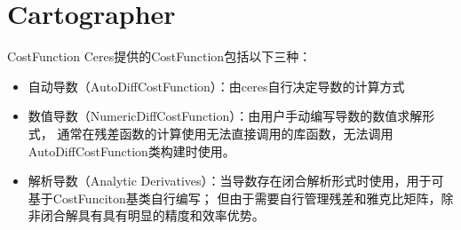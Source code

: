 \section{Cartographer}


\begin{frame}{CostFunction}
Ceres提供的CostFunction包括以下三种：

\begin{itemize}
  \item 自动导数（AutoDiffCostFunction）：由ceres自行决定导数的计算方式
  \item 数值导数（NumericDiffCostFunction）：由用户手动编写导数的数值求解形式，
        通常在残差函数的计算使用无法直接调用的库函数，无法调用AutoDiffCostFunction类构建时使用。
  \item 解析导数（Analytic Derivatives）：当导数存在闭合解析形式时使用，用于可基于CostFunciton基类自行编写；
        但由于需要自行管理残差和雅克比矩阵，除非闭合解具有具有明显的精度和效率优势。
\end{itemize}
\end{frame}

